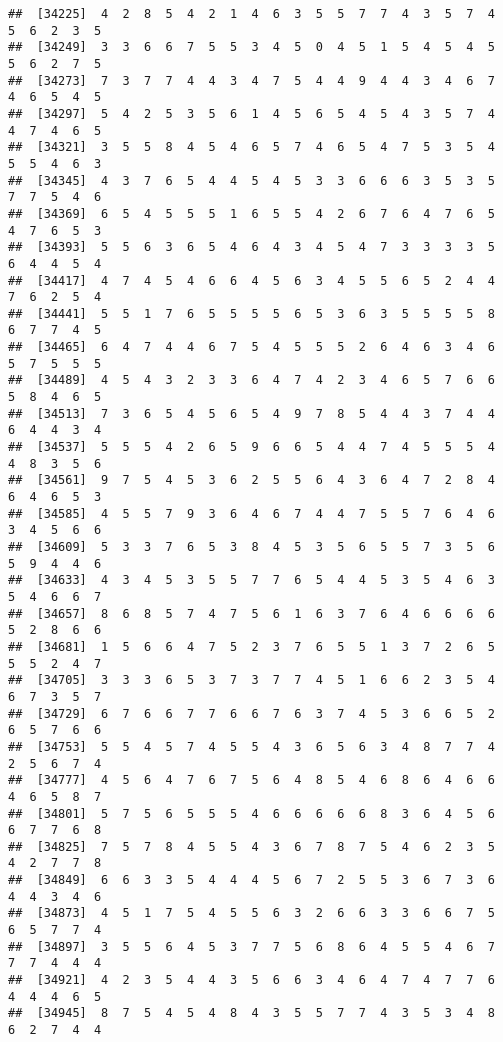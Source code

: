 \documentclass[
]{book}
\begin{document}
\begin{verbatim}
##  [34225]  4  2  8  5  4  2  1  4  6  3  5  5  7  7  4  3  5  7  4  5  6  2  3  5
##  [34249]  3  3  6  6  7  5  5  3  4  5  0  4  5  1  5  4  5  4  5  5  6  2  7  5
##  [34273]  7  3  7  7  4  4  3  4  7  5  4  4  9  4  4  3  4  6  7  4  6  5  4  5
##  [34297]  5  4  2  5  3  5  6  1  4  5  6  5  4  5  4  3  5  7  4  4  7  4  6  5
##  [34321]  3  5  5  8  4  5  4  6  5  7  4  6  5  4  7  5  3  5  4  5  5  4  6  3
##  [34345]  4  3  7  6  5  4  4  5  4  5  3  3  6  6  6  3  5  3  5  7  7  5  4  6
##  [34369]  6  5  4  5  5  5  1  6  5  5  4  2  6  7  6  4  7  6  5  4  7  6  5  3
##  [34393]  5  5  6  3  6  5  4  6  4  3  4  5  4  7  3  3  3  3  5  6  4  4  5  4
##  [34417]  4  7  4  5  4  6  6  4  5  6  3  4  5  5  6  5  2  4  4  7  6  2  5  4
##  [34441]  5  5  1  7  6  5  5  5  5  6  5  3  6  3  5  5  5  5  8  6  7  7  4  5
##  [34465]  6  4  7  4  4  6  7  5  4  5  5  5  2  6  4  6  3  4  6  5  7  5  5  5
##  [34489]  4  5  4  3  2  3  3  6  4  7  4  2  3  4  6  5  7  6  6  5  8  4  6  5
##  [34513]  7  3  6  5  4  5  6  5  4  9  7  8  5  4  4  3  7  4  4  6  4  4  3  4
##  [34537]  5  5  5  4  2  6  5  9  6  6  5  4  4  7  4  5  5  5  4  4  8  3  5  6
##  [34561]  9  7  5  4  5  3  6  2  5  5  6  4  3  6  4  7  2  8  4  6  4  6  5  3
##  [34585]  4  5  5  7  9  3  6  4  6  7  4  4  7  5  5  7  6  4  6  3  4  5  6  6
##  [34609]  5  3  3  7  6  5  3  8  4  5  3  5  6  5  5  7  3  5  6  5  9  4  4  6
##  [34633]  4  3  4  5  3  5  5  7  7  6  5  4  4  5  3  5  4  6  3  5  4  6  6  7
##  [34657]  8  6  8  5  7  4  7  5  6  1  6  3  7  6  4  6  6  6  6  5  2  8  6  6
##  [34681]  1  5  6  6  4  7  5  2  3  7  6  5  5  1  3  7  2  6  5  5  5  2  4  7
##  [34705]  3  3  3  6  5  3  7  3  7  7  4  5  1  6  6  2  3  5  4  6  7  3  5  7
##  [34729]  6  7  6  6  7  7  6  6  7  6  3  7  4  5  3  6  6  5  2  6  5  7  6  6
##  [34753]  5  5  4  5  7  4  5  5  4  3  6  5  6  3  4  8  7  7  4  2  5  6  7  4
##  [34777]  4  5  6  4  7  6  7  5  6  4  8  5  4  6  8  6  4  6  6  4  6  5  8  7
##  [34801]  5  7  5  6  5  5  5  4  6  6  6  6  6  8  3  6  4  5  6  6  7  7  6  8
##  [34825]  7  5  7  8  4  5  5  4  3  6  7  8  7  5  4  6  2  3  5  4  2  7  7  8
##  [34849]  6  6  3  3  5  4  4  4  5  6  7  2  5  5  3  6  7  3  6  4  4  3  4  6
##  [34873]  4  5  1  7  5  4  5  5  6  3  2  6  6  3  3  6  6  7  5  6  5  7  7  4
##  [34897]  3  5  5  6  4  5  3  7  7  5  6  8  6  4  5  5  4  6  7  7  7  4  4  4
##  [34921]  4  2  3  5  4  4  3  5  6  6  3  4  6  4  7  4  7  7  6  4  4  4  6  5
##  [34945]  8  7  5  4  5  4  8  4  3  5  5  7  7  4  3  5  3  4  8  6  2  7  4  4

\end{verbatim}
\end{document}

